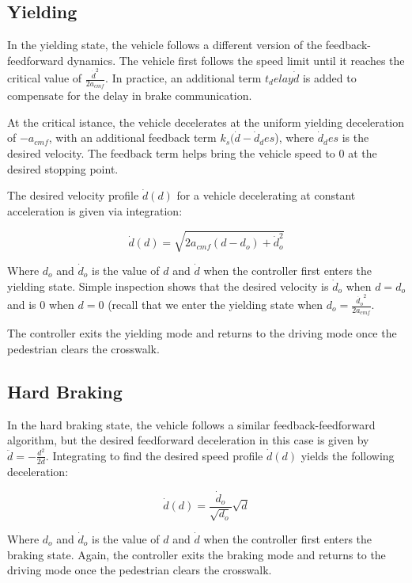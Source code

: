 \documentclass[letterpaper, 10 pt, conference]{ieeeconf}  %
\begin{document}
\subsection{Yielding}

In the yielding state, the vehicle follows a different version of the feedback-feedforward dynamics. The vehicle first follows the speed limit until it reaches the critical value of $\frac{\dot{d}^2}{2a_{cmf}}$. In practice, an additional term $t_delay\dot{d}$ is added to compensate for the delay in brake communication. 

At the critical istance, the vehicle decelerates at the uniform yielding deceleration of $-a_{cmf}$, with an additional feedback term $k_s(\dot{d} - \dot{d}_des$), where $\dot{d}_des$ is the desired velocity. The feedback term helps bring the vehicle speed to 0 at the desired stopping point. 

The desired velocity profile $\dot{d}(d)$ for a vehicle decelerating at constant acceleration is given via integration: 

\begin{equation}
\dot{d}(d) = \sqrt{2a_{cmf}(d-d_o) + \dot{d}_o^2}
\end{equation}

Where $d_o$ and $\dot{d}_o$ is the value of $d$ and $\dot{d}$ when the controller first enters the yielding state. Simple inspection shows that the desired velocity is $\dot{d}_o$ when $d = d_o$ and is 0 when $d = 0$ (recall that we enter the yielding state when $d_o = \frac{\dot{d_o}^2}{2a_{cmf}}$. 

The controller exits the yielding mode and returns to the driving mode once the pedestrian clears the crosswalk. 

\subsection{Hard Braking}

In the hard braking state, the vehicle follows a similar feedback-feedforward algorithm, but the desired feedforward deceleration in this case is given by $\ddot{d} = -\frac{d^2}{2d}$. Integrating to find the desired speed profile $\dot{d}(d)$ yields the following deceleration: 

\begin{equation}
\dot{d}(d) = \frac{\dot{d}_o}{\sqrt{d_o}}\sqrt{d}
\end{equation}     

Where $d_o$ and $\dot{d}_o$ is the value of $d$ and $\dot{d}$ when the controller first enters the braking state. Again, the controller exits the braking mode and returns to the driving mode once the pedestrian clears the crosswalk. 
\end{document}
